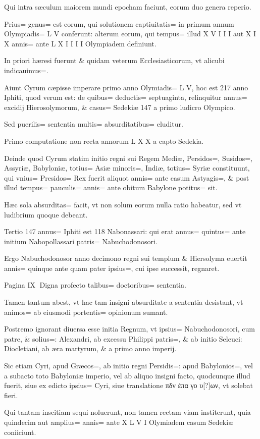 \begin{parnumbers}
Qui intra sæculum maiorem mundi epocham faciunt, eorum duo genera reperio.

Prius= genus= est eorum, qui solutionem captiuitatis= in primum annum Olympiadis= L V conferunt: alterum eorum, qui tempus= illud X V I I I aut X I X annis= ante L X I I I I Olympiadem definiunt.

In priori hæresi fuerunt \& quidam veterum Ecclesiasticorum, vt alicubi indicauimus=. 

Aiunt Cyrum cæpisse imperare primo anno Olymiadis= L V, hoc est 217 anno Iphiti, quod verum est: de quibus= deductis= septuaginta, relinquitur annus= excidij Hierosolymorum, \& casus= Sedekiæ 147 a primo ludicro Olympico.

Sed puerilis= sententia multis= absurditatibus= eluditur.

Primo computatione non recta annorum L X X a capto Sedekia.

Deinde quod Cyrum statim initio regni sui Regem Mediæ, Persidos=, Susidos=, Assyriæ, Babyloniæ, totius= Asiæ minoris=, Indiæ, totius= Syriæ constituunt, qui vnius= Presidos= Rex fuerit aliquot annis= ante casum Astyagis=, \& post illud tempus= pauculis= annis= ante obitum Babylone potitus= sit.

Hæc sola absurditas= facit, vt non solum eorum nulla ratio habeatur, sed vt ludibrium quoque debeant.

Tertio 147 annus= Iphiti est 118 Nabonassari: qui erat annus= quintus= ante initium Nabopollassari patris= Nabuchodonosori.

Ergo Nabuchodonosor anno decimono regni sui templum \& Hiersolyma euertit annis= quinque ante quam pater ipsius=, cui ipse successit, regnaret.

Pagina IX
Digna profecto talibus= doctoribus= sententia.

Tamen tantum abest, vt hac tam insigni absurditate a sententia desistant, vt animos= ab eiusmodi portentis= opinionum sumant.

Postremo ignorant diuersa esse initia Regnum, vt ipsius= Nabuchodonosori, cum patre, \& solius=: Alexandri, ab excessu Philippi patris=, \& ab initio Seleuci: Diocletiani, ab æra martyrum, \& a primo anno imperij.

Sic etiam Cyri, apud Græcos=, ab initio regni Persidis=: apud Babylonios=, vel a subacto toto Babyloniæ imperio, vel ab aliquo insigni facto, quodcunque illud fuerit, siue ex edicto ipsius= Cyri, siue translatione πδν ἐπα γο υ[?]ων, vt solebat fieri.

Qui tantam inscitiam sequi noluerunt, non tamen rectam viam institerunt, quia quindecim aut amplius= annis= ante X L V I Olymiadem casum Sedekiæ coniiciunt.


\end{parnumbers}
